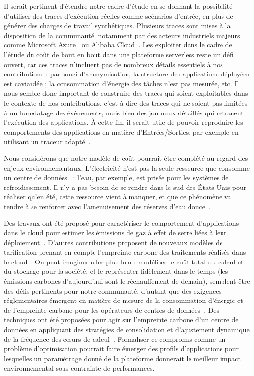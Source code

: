 Il serait pertinent d'étendre notre cadre d'étude en se donnant la possibilité d'utiliser des traces d'exécution réelles comme scénarios d'entrée, en plus de générer des charges de travail synthétiques. Plusieurs traces sont mises à la disposition de la communauté, notamment par des acteurs industriels majeurs comme Microsoft Azure~\cite{cortezResourceCentralUnderstanding2017a} ou Alibaba Cloud~\cite{mahmoudiSimFaaSPerformanceSimulator2021}. Les exploiter dans le cadre de l'étude du coût de bout en bout dans une plateforme serverless reste un défi ouvert, car ces traces n'incluent pas de nombreux détails essentiels à nos contributions : par souci d'anonymisation, la structure des applications déployées est caviardée ; la consommation d'énergie des tâches n'est pas mesurée, etc. Il nous semble donc important de construire des traces qui soient exploitables dans le contexte de nos contributions, c'est-à-dire des traces qui ne soient pas limitées à un horodatage des événements, mais bien des journaux détaillés qui retracent l'exécution des applications. À cette fin, il serait utile de pouvoir reproduire les comportements des applications en matière d'Entrées/Sorties, par exemple en utilisant un traceur adapté~\cite{naasEZIOTracerUnifyingKernel2021, ouarnoughiMultilevelTracerTiming}.

Nous considérons que notre modèle de coût pourrait être complété au regard des enjeux environnementaux. L'électricité n'est pas la seule ressource que consomme un centre de données~\cite{rickeCountrylevelSocialCost2018} : l'eau, par exemple, est prisée pour les systèmes de refroidissement. Il n'y a pas besoin de se rendre dans le sud des États-Unis pour réaliser qu'en été, cette ressource vient à manquer, et que ce phénomène va tendre à se renforcer avec l'amenuisement des réserves d'eau douce~\cite{EauAvecRessource2024}.

Des travaux ont été proposé pour caractériser le comportement d'applications dans le cloud pour estimer les émissions de gaz à effet de serre liées à leur déploiement~\cite{courageux-sudanStudyingEndendPerformancea}. D'autres contributions proposent de nouveaux modèles de tarification prenant en compte l'empreinte carbone des traitements réalisés dans le cloud~\cite{linBridgingSustainabilityGap2024}. On peut imaginer aller plus loin : modéliser le coût total du calcul et du stockage pour la société, et le représenter fidèlement dans le temps (les émissions carbones d'aujourd'hui sont le réchauffement de demain), semblent être des défis pertinents pour notre communauté, d'autant que des exigences réglementaires émergent en matière de mesure de la consommation d'énergie et de l'empreinte carbone pour les opérateurs de centres de données~\cite{davisUptimeInstituteGlobal2022}. Des techniques ont été proposées pour agir sur l'empreinte carbone d'un centre de données en appliquant des stratégies de consolidation et d'ajustement dynamique de la fréquence des cœurs de calcul~\cite{ostapencoModelingEvaluatingOrchestrating2023}. Formaliser ce compromis comme un problème d'optimisation pourrait faire émerger des profils d'applications pour lesquelles un paramétrage donné de la plateforme donnerait le meilleur impact environnemental sous contrainte de performances.

